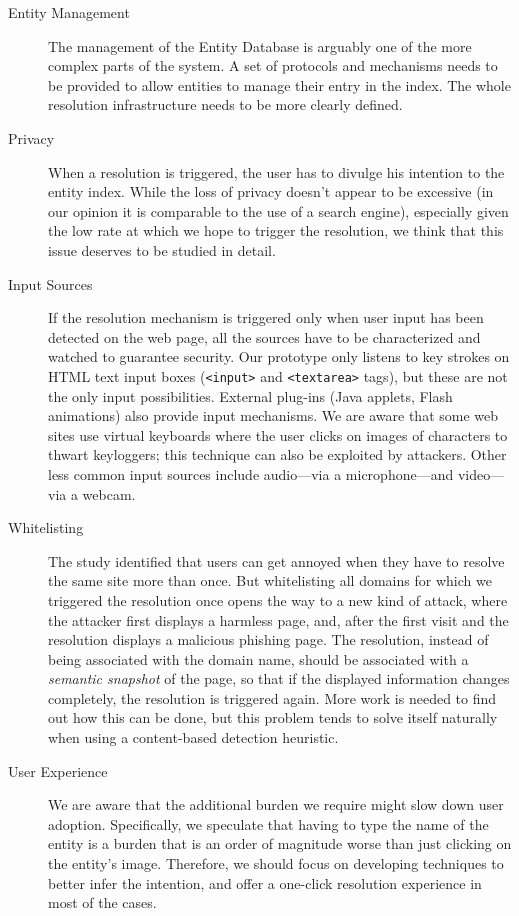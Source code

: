 \documentclass[11pt,styles/chicago]{article}
\begin{document}
\begin{description}
\item[Entity Management] The management of the Entity Database is arguably one of the more complex parts of the system. A set of protocols and mechanisms needs to be provided to allow entities to manage their entry in the index. The whole resolution infrastructure needs to be more clearly defined.

\item[Privacy] When a resolution is triggered, the user has to divulge his intention to the entity index. While the loss of privacy doesn't appear to be excessive (in our opinion it is comparable to the use of a search engine), especially given the low rate at which we hope to trigger the resolution, we think that this issue deserves to be studied in detail.

\item[Input Sources] If the resolution mechanism is triggered only when user input has been detected on the web page, all the sources have to be characterized and watched to guarantee security. Our prototype only listens to key strokes on HTML text input boxes (\texttt{<input>} and \texttt{<textarea>} tags), but these are not the only input possibilities. External plug-ins (Java applets, Flash animations) also provide input mechanisms. We are aware that some web sites use virtual keyboards where the user clicks on images of characters to thwart keyloggers; this technique can also be exploited by attackers. Other less common input sources include audio---via a microphone---and video---via a webcam.

\item[Whitelisting] The study identified that users can get annoyed when they have to resolve the same site more than once. But whitelisting all domains for which we triggered the resolution once opens the way to a new kind of attack, where the attacker first displays a harmless page, and, after the first visit and the resolution displays a malicious phishing page. The resolution, instead of being associated with the domain name, should be associated with a \emph{semantic snapshot} of the page, so that if the displayed information changes completely, the resolution is triggered again. More work is needed to find out how this can be done, but this problem tends to solve itself naturally when using a content-based detection heuristic.

\item[User Experience] We are aware that the additional burden we require might slow down user adoption. Specifically, we speculate that having to type the name of the entity is a burden that is an order of magnitude worse than just clicking on the entity's image. Therefore, we should focus on developing techniques to better infer the intention, and offer a one-click resolution experience in most of the cases.


\end{description}
\end{document}
